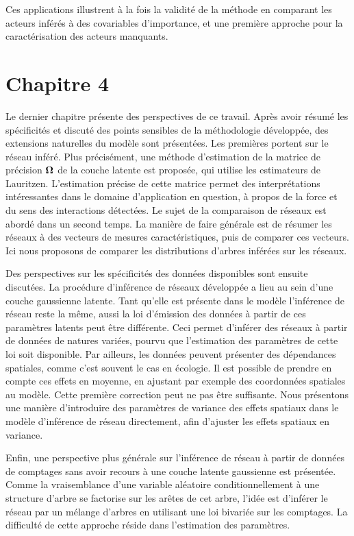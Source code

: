 Ces applications  illustrent à la fois la validité de la méthode en comparant les acteurs inférés à des covariables d'importance, et une première approche pour la caractérisation des acteurs manquants.

 
\section*{Chapitre 4}
Le dernier chapitre présente des perspectives de ce travail. Après avoir résumé les spécificités et discuté des points sensibles de la méthodologie développée, des extensions naturelles du modèle sont présentées.  Les premières  portent sur le réseau inféré. Plus précisément, une méthode d'estimation de la matrice de précision ${\boldsymbol{\Omega}}$ de la couche latente est proposée, qui utilise les estimateurs de Lauritzen. L'estimation précise de cette matrice permet des interprétations intéressantes dans le domaine d'application en question, à propos de la force et du sens des interactions détectées. Le sujet de la comparaison de réseaux est abordé dans un second temps. La manière de faire générale est de résumer les réseaux à des vecteurs de mesures caractéristiques, puis de comparer ces vecteurs. Ici nous proposons de comparer les distributions d'arbres inférées sur les réseaux. 

Des perspectives sur les spécificités des données  disponibles sont ensuite discutées. La procédure d'inférence de réseaux développée a lieu au sein d'une couche gaussienne latente. Tant qu'elle est présente dans le modèle l'inférence de réseau reste la même, aussi la loi d'émission des données à partir de ces paramètres latents peut être différente. Ceci permet d'inférer des réseaux à partir de données de natures variées, pourvu que l'estimation des paramètres de cette loi soit disponible. Par ailleurs, les données peuvent présenter des dépendances spatiales, comme c'est souvent le cas en écologie. Il est possible de prendre en compte ces effets en moyenne, en ajustant par exemple des coordonnées spatiales au modèle. Cette première correction peut ne pas être suffisante. Nous présentons une manière d'introduire des paramètres de variance des effets spatiaux dans le modèle d'inférence de réseau directement, afin d'ajuster les effets spatiaux en variance.


Enfin, une perspective plus générale sur l'inférence de réseau à partir de données de comptages sans avoir recours à une couche latente gaussienne est présentée. Comme la vraisemblance d'une variable aléatoire conditionnellement à une structure d'arbre se factorise sur les arêtes de cet arbre, l'idée est d'inférer le réseau par un mélange d'arbres en utilisant une loi bivariée sur les comptages. La difficulté de cette approche réside dans l'estimation des paramètres.
